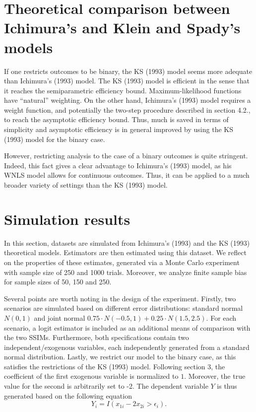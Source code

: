 \section{Theoretical comparison between Ichimura's and Klein and Spady's models} %
\label{sec:Theoretical comparison between Ichimura's and Klein and Spady's models}
If one restricts outcomes to be binary, the KS (1993) \cite{[12]} model seems more adequate than Ichimura's (1993) \cite{[6]} model. The KS (1993) \cite{[12]} model is efficient in the sense that it reaches the semiparametric efficiency bound. Maximum-likelihood functions have ``natural'' weighting. On the other hand, Ichimura's (1993) \cite{[6]} model requires a weight function, and potentially the two-step procedure described in section 4.2., to reach the asymptotic efficiency bound. Thus, much is saved in terms of simplicity and asymptotic efficiency is in general improved by using the KS (1993) \cite{[12]} model for the binary case.

However, restricting analysis to the case of a binary outcomes is quite stringent. Indeed, this fact gives a clear advantage to Ichimura's (1993) \cite{[6]} model, as his WNLS model allows for continuous outcomes. Thus, it can be applied to a much broader variety of settings than the KS (1993) \cite{[12]}  model.

\section{Simulation results} %
\label{sec:Simulation results}
In this section, datasets are simulated from Ichimura's (1993) \cite{[6]} and the KS (1993) \cite{[12]} theoretical models. Estimators are then estimated using this dataset. We reflect on the properties of these estimates, generated via a Monte Carlo experiment with sample size of 250 and 1000 trials. Moreover, we analyze finite sample bias for sample sizes of 50, 150 and 250.

Several points are worth noting in the design of the experiment. Firstly, two scenarios are simulated based on different error distributions: standard normal $N(0,1)$ and joint normal $0.75 \cdot N(-0.5,1)+0.25\cdot N(1.5,2.5)$. For each scenario, a logit estimator is included as an additional means of comparison with the two SSIMs. Furthermore, both specifications contain two independent/exogenous variables, each independently generated from a standard normal distribution.  Lastly, we restrict our model to the binary case, as this satisfies the restrictions of the KS (1993) \cite{[12]} model. Following section 3, the coefficient of the first exogenous variable is normalized to $1$. Moreover, the true value for the second is arbitrarily set to -2. The dependent variable $Y$ is thus generated based on the following equation
\begin{equation*}
Y_i = I(x_{1i} - 2x_{2i} > \epsilon_i).
\end{equation*}

